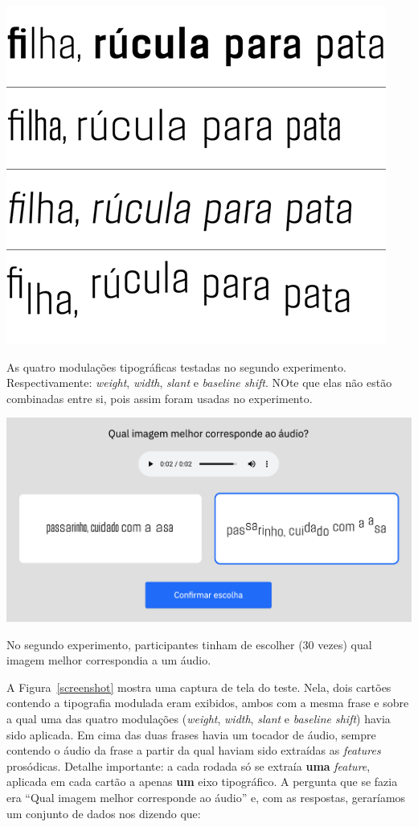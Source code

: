 \documentclass[a4paper]{tufte-handout}
\begin{document}
\begin{marginfigure}
  \includegraphics{imgs/modulacoes-experimento-2.png}
  \caption{As quatro modulações tipográficas testadas no segundo experimento. Respectivamente: \textit{weight}, \textit{width}, \textit{slant} e \textit{baseline shift}. NOte que elas não estão combinadas entre si, pois assim foram usadas no experimento.}
  \label{mods-exp-2}
\end{marginfigure}

\begin{marginfigure}[\baselineskip]
  \includegraphics{imgs/test_screenshot2.png}
  \caption{No segundo experimento, participantes tinham de escolher (30 vezes) qual imagem melhor correspondia a um áudio.}
  \label{screenshot}
\end{marginfigure}


A Figura~\ref{screenshot} mostra uma captura de tela do teste. Nela, dois cartões contendo a tipografia modulada eram exibidos, ambos com a mesma frase e sobre a qual uma das quatro modulações (\textit{weight}, \textit{width}, \textit{slant} e \textit{baseline shift}) havia sido aplicada. Em cima das duas frases havia um tocador de áudio, sempre contendo o áudio da frase a partir da qual haviam sido extraídas as \textit{features} prosódicas. Detalhe importante: a cada rodada só se extraía \textbf{uma} \textit{feature}, aplicada em cada cartão a apenas \textbf{um} eixo tipográfico. A pergunta que se fazia era ``Qual imagem melhor corresponde ao áudio'' e, com as respostas, geraríamos um conjunto de dados nos dizendo que: 
\end{document}
